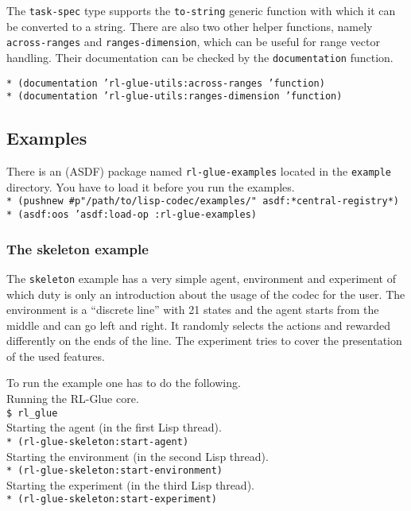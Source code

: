 \documentclass[11pt,a4paper,dvipdfm]{article}
\newcommand{\prompttext}[1]{\texttt{#1}}
\newcommand{\shprompt}[1]{\prompttext{\$ #1}}
\newcommand{\lispprompt}[1]{\prompttext{* #1}}
\begin{document}
The \prompttext{task-spec} type supports the \prompttext{to-string} generic
function with which it can be converted to a string. There are also two other
helper functions, namely \prompttext{across-ranges} and
\prompttext{ranges-dimension}, which can be useful for range vector handling.
Their documentation can be checked by the \prompttext{documentation} function.

\lispprompt{(documentation 'rl-glue-utils:across-ranges 'function)} \\
\lispprompt{(documentation 'rl-glue-utils:ranges-dimension 'function)}

\hypertarget{examples}{\subsection{Examples}}

There is an (ASDF) package named \prompttext{rl-glue-examples} located
in the \prompttext{example} directory. You have to load it before you
run the examples. \\
\lispprompt{(pushnew \#p"/path/to/lisp-codec/examples/" asdf:*central-registry*)} \\
\lispprompt{(asdf:oos 'asdf:load-op :rl-glue-examples)}

\subsubsection{The skeleton example}

The \prompttext{skeleton} example has a very simple agent, environment
and experiment of which duty is only an introduction about the usage of
the codec for the user. The environment is a ``discrete line'' with 21
states and the agent starts from the middle and can go left and right.
It randomly selects the actions and rewarded differently on the ends of
the line. The experiment tries to cover the presentation of the used
features.

To run the example one has to do the following. \\
Running the RL-Glue core. \\
\shprompt{rl\_glue} \\
Starting the agent (in the first Lisp thread). \\
\lispprompt{(rl-glue-skeleton:start-agent)} \\
Starting the environment (in the second Lisp thread). \\
\lispprompt{(rl-glue-skeleton:start-environment)} \\
Starting the experiment (in the third Lisp thread). \\
\lispprompt{(rl-glue-skeleton:start-experiment)}
\end{document}
